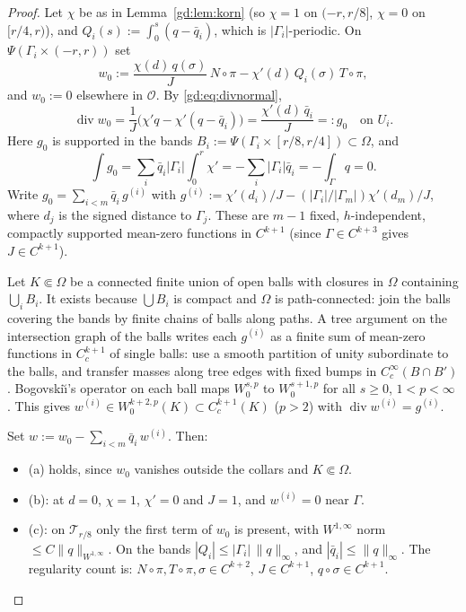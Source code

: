\documentclass[11pt,reqno]{amsart}
\theoremstyle{plain}
\theoremstyle{definition}
\newcommand{\norm}[1]{\lVert #1\rVert}
\renewcommand{\div}{\operatorname{div}}
\begin{document}
\begin{proof}
Let $\chi$ be as in Lemma~\ref{gd:lem:korn} (so $\chi=1$ on $(-r,r/8]$, $\chi=0$ on $[r/4,r)$), and $Q_i(s):=\int_0^s(q-\bar q_i)$, which is $|\Gamma_i|$-periodic. On $\Psi(\Gamma_i\times(-r,r))$ set
\[
w_0:=\frac{\chi(d)\,q(\sigma)}{J}\,N\circ\pi-\chi'(d)\,Q_i(\sigma)\,T\circ\pi ,
\]
and $w_0:=0$ elsewhere in $\mathcal O$. By \eqref{gd:eq:divnormal},
\[
\div w_0=\frac1J\bigl(\chi'q-\chi'(q-\bar q_i)\bigr)=\frac{\chi'(d)\,\bar q_i}{J}=:g_0\quad\text{on }U_i .
\]
Here $g_0$ is supported in the bands $B_i:=\Psi(\Gamma_i\times[r/8,r/4])\subset\Omega$, and
\[
\int g_0=\sum_i\bar q_i|\Gamma_i|\int_0^r\chi'=-\sum_i|\Gamma_i|\bar q_i=-\int_\Gamma q=0 .
\]
Write $g_0=\sum_{i<m}\bar q_i\,g^{(i)}$ with $g^{(i)}:=\chi'(d_i)/J-(|\Gamma_i|/|\Gamma_m|)\chi'(d_m)/J$, where $d_j$ is the signed distance to $\Gamma_j$. These are $m-1$ fixed, $h$-independent, compactly supported mean-zero functions in $C^{k+1}$ (since $\Gamma\in C^{k+3}$ gives $J\in C^{k+1}$).

Let $K\Subset\Omega$ be a connected finite union of open balls with closures in $\Omega$ containing $\bigcup_iB_i$. It exists because $\bigcup B_i$ is compact and $\Omega$ is path-connected: join the balls covering the bands by finite chains of balls along paths. A tree argument on the intersection graph of the balls writes each $g^{(i)}$ as a finite sum of mean-zero functions in $C^{k+1}_c$ of single balls: use a smooth partition of unity subordinate to the balls, and transfer masses along tree edges with fixed bumps in $C^\infty_c(B\cap B')$. Bogovski\u{\i}'s operator on each ball maps $W^{s,p}_0$ to $W^{s+1,p}_0$ for all $s\ge0$, $1<p<\infty$ \cite[Thm.~III.3.3]{Galdi}. This gives $w^{(i)}\in W^{k+2,p}_0(K)\subset C^{k+1}_c(K)$ ($p>2$) with $\div w^{(i)}=g^{(i)}$.

Set $w:=w_0-\sum_{i<m}\bar q_i\,w^{(i)}$. Then:
\begin{itemize}
\item (a) holds, since $w_0$ vanishes outside the collars and $K\Subset\Omega$.
\item (b): at $d=0$, $\chi=1$, $\chi'=0$ and $J=1$, and $w^{(i)}=0$ near $\Gamma$.
\item (c): on $\mathcal T_{r/8}$ only the first term of $w_0$ is present, with $W^{1,\infty}$ norm $\le C\norm q_{W^{1,\infty}}$. On the bands $|Q_i|\le|\Gamma_i|\,\norm q_\infty$, and $|\bar q_i|\le\norm q_\infty$. The regularity count is: $N\circ\pi,T\circ\pi,\sigma\in C^{k+2}$, $J\in C^{k+1}$, $q\circ\sigma\in C^{k+1}$.\qedhere
\end{itemize}
\end{proof}
\end{document}
